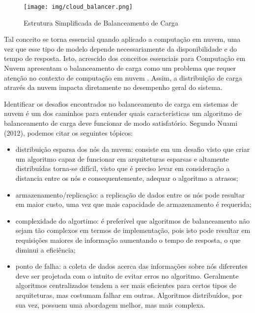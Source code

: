 \begin{figure}[htb]
	\caption{\label{fig:bal}Estrutura Simplificada de Balanceamento de Carga}
	\begin{center}
		\texttt{[image: img/cloud\_balancer.png]}
	\end{center}
\end{figure} 

Tal conceito se torna essencial quando aplicado a computação em nuvem, uma vez que esse tipo de modelo depende necessariamente da disponibilidade e do tempo de resposta. Isto, acrescido dos conceitos essenciais para Computação em Nuvem apresentam o balanceamento de carga como um problema que requer atenção no contexto de computação em nuvem \cite{sran2013comparative}. Assim, a distribuição de carga através da nuvem impacta diretamente no desempenho geral do sistema. 

Identificar os desafios encontrados no balanceamento de carga em sistemas de nuvem é um dos caminhos para entender quais características um algoritmo de balanceamento de carga deve funcionar de modo satisfatório. Segundo Nuami (2012), podemos citar os seguintes tópicos: 

\begin{itemize}
	\item distribuição esparsa dos nós da nuvem: consiste em um desafio visto que criar um algoritmo capaz de funcionar em arquiteturas esparsas e altamente distribuídas torna-se difícil, visto que é preciso levar em consideração a distancia entre os nós e consequentemente, adequar o algoritmo a atrasos; 
	
	\item armazenamento/replicação: a replicação de dados entre os nós pode resultar em maior custo, uma vez que mais capacidade de armazenamento é requerida;
	
	\item complexidade do algortimo: é preferível que algoritmos de balanceamento não sejam tão complexos em termos de implementação, pois isto pode resultar em requisições maiores de informação aumentando o tempo de resposta, o que diminui a eficiência; 
	
	\item ponto de falha: a coleta de dados acerca das informações sobre nós diferentes deve ser projetada com o intuito de evitar erros no algoritmo. Geralmente algoritmos centralizados tendem a ser mais eficientes para certos tipos de arquiteturas, mas costumam falhar em outras. Algoritmos distribuídos, por sua vez, possuem uma abordagem melhor, mas mais complexa.
\end{itemize}

